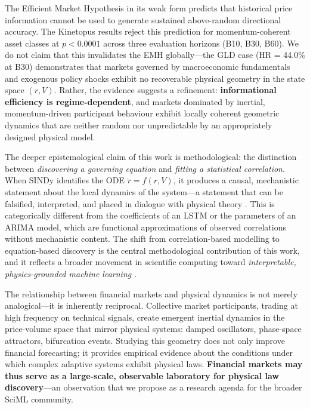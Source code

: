 \documentclass[11pt,a4paper]{article}
\begin{document}
The Efficient Market Hypothesis in its weak form \cite{fama1970efficient} predicts that historical price information cannot be used to generate sustained above-random directional accuracy. The Kinetopus results reject this prediction for momentum-coherent asset classes at $p < 0.0001$ across three evaluation horizons (B10, B30, B60). We do not claim that this invalidates the EMH globally---the GLD case (HR = 44.0\% at B30) demonstrates that markets governed by macroeconomic fundamentals and exogenous policy shocks exhibit no recoverable physical geometry in the state space $(r, V)$. Rather, the evidence suggests a refinement: \textbf{informational efficiency is regime-dependent}, and markets dominated by inertial, momentum-driven participant behaviour exhibit locally coherent geometric dynamics that are neither random nor unpredictable by an appropriately designed physical model.

The deeper epistemological claim of this work is methodological: the distinction between \textit{discovering a governing equation} and \textit{fitting a statistical correlation}. When SINDy identifies the ODE $\dot{r} = f(r, V)$, it produces a causal, mechanistic statement about the local dynamics of the system---a statement that can be falsified, interpreted, and placed in dialogue with physical theory \cite{brunton2016discovering, raissi2019physics}. This is categorically different from the coefficients of an LSTM or the parameters of an ARIMA model, which are functional approximations of observed correlations without mechanistic content. The shift from correlation-based modelling to equation-based discovery is the central methodological contribution of this work, and it reflects a broader movement in scientific computing toward \textit{interpretable, physics-grounded machine learning} \cite{chen2018neural}.

The relationship between financial markets and physical dynamics is not merely analogical---it is inherently reciprocal. Collective market participants, trading at high frequency on technical signals, create emergent inertial dynamics in the price-volume space that mirror physical systems: damped oscillators, phase-space attractors, bifurcation events. Studying this geometry does not only improve financial forecasting; it provides empirical evidence about the conditions under which complex adaptive systems exhibit physical laws. \textbf{Financial markets may thus serve as a large-scale, observable laboratory for physical law discovery}---an observation that we propose as a research agenda for the broader SciML community.
\end{document}
